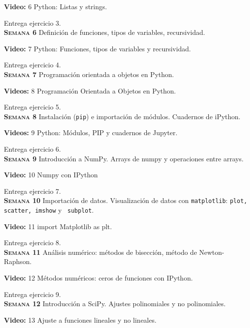 \documentclass[letterpaper,10pt,onecolumn]{article}
\begin{document}
\textbf{Video:} 6  Python: Listas y strings.

Entrega ejercicio 3.
\\[-0.3cm] 

\noindent\textbf{\textsc{Semana 6}} Definición de funciones,
tipos de variables, recursividad. 

\textbf{Video:} 7 Python: Funciones, tipos de variables y recursividad.

Entrega ejercicio 4.
\\[-0.3cm] 

\noindent\textbf{\textsc{Semana 7}} Programaci\'on orientada a objetos en Python. 

\textbf{Videos:} 8 Programación Orientada a Objetos en Python.

Entrega ejercicio 5.
\\[-0.3cm]  

\noindent\textbf{\textsc{Semana 8}} Instalación (\verb+pip+) e importación de módulos. Cuadernos de iPython.

\textbf{Videos:} 9 Python: Módulos, PIP y cuadernos de Jupyter.

Entrega ejercicio 6.
\\[-0.3cm]  


\noindent\textbf{\textsc{Semana 9}} Introducción a NumPy. Arrays de numpy y operaciones entre arrays. 

\textbf{Video:} 10 Numpy con IPython

Entrega ejercicio 7.
\\[-0.3cm]  


\noindent\textbf{\textsc{Semana 10}}  Importación de datos. Visualización de datos con
\verb+matplotlib+: \verb+plot, scatter, imshow+ y  \verb+ subplot+.

\textbf{Video:} 11 import Matplotlib as plt.

Entrega ejercicio 8.
\\[-0.3cm]  

\noindent\textbf{\textsc{Semana 11}} Análisis numérico: métodos de bisección, método de Newton-Raphson. 

\textbf{Video:} 12 Métodos numéricos: ceros de funciones con IPython.

Entrega ejercicio 9.
\\[-0.3cm]  


\noindent\textbf{\textsc{Semana 12}} Introducción a
SciPy. Ajustes polinomiales y no polinomiales.

\textbf{Video:} 13 Ajuste a funciones lineales y no lineales.
\end{document}
